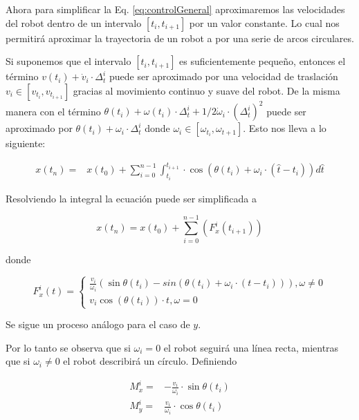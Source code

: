 \documentclass[12pt]{article}
\begin{document}
Ahora para simplificar la Eq. \ref{eq:controlGeneral} aproximaremos las velocidades del robot dentro de un intervalo $[t_i, t_{i+1}]$ por un valor constante. Lo cual nos permitirá aproximar la trayectoria de un robot a por una serie de arcos circulares.

Si suponemos que el intervalo $[t_i, t_{i+1}]$ es suficientemente pequeño, entonces el término $v(t_i) + \dot{v}_i \cdot \Delta_t^i$ puede ser aproximado por una velocidad de traslación $v_i \in [v_{t_i}, v_{t_{i+1}}]$ gracias al movimiento continuo y suave del robot. De la misma manera con el término $\theta(t_i) + \omega(t_i)\cdot\Delta_t^i + 1/2 \dot{\omega}_i \cdot (\Delta_t^i)^2$ puede ser aproximado por $ \theta(t_i) + \omega_i \cdot \Delta_t^i $ donde $\omega_i \in [\omega_{t_i}, \omega_{t+1}]$. Esto nos lleva a lo siguiente:

\begin{equation}
\begin{aligned}
	x(t_n) = &
		x(t_0) + \sum_{i=0}^{n-1} \int_{t_i}^{t_{i+1}} \cdot
		\cos \left( \theta(t_i) + \omega_i \cdot(\hat{t} - t_i) \right) d\hat{t}
\end{aligned}
\end{equation}

Resolviendo la integral la ecuación puede ser simplificada a

\begin{equation}
	x(t_n) = x(t_0) + \sum_{i=0}^{n-1} (F_x^i(t_{i+1}))
\end{equation}

donde

\begin{equation}
	F_x^i(t) = 
	\begin{cases}
		\frac{v_i}{\omega_i} (
			\sin \theta(t_i) - sin( \theta(t_i) +  \omega_i \cdot ( 				t - t_i))
		), \omega \neq 0 \\
		v_i \cos( \theta(t_i)) \cdot t, \omega = 0
	\end{cases}
\end{equation}

Se sigue un proceso análogo para el caso de $y$.

Por lo tanto se observa que si $\omega_i = 0$ el robot seguirá una línea recta, mientras que si $\omega_i \neq 0$ el robot describirá un círculo. Definiendo

\begin{align}
	M_x^i = 
		&- \frac{v_i}{\omega_i} \cdot \sin\theta(t_i)
	\\ 
	M_y^i = &\frac{v_i}{\omega_i} \cdot \cos\theta(t_i)
\end{align}
\end{document}
